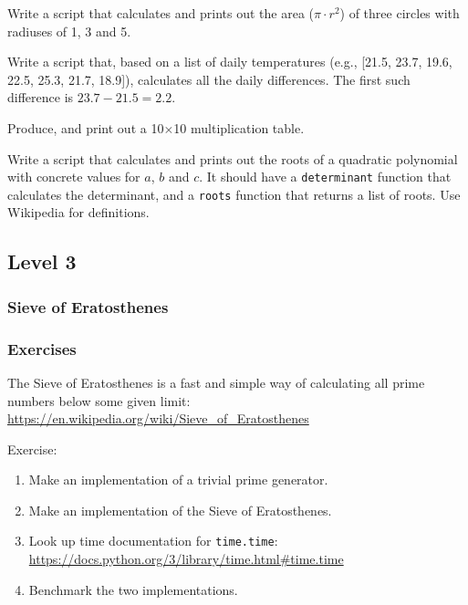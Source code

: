 {\begin{frame}[fragile]
    \vspace{3mm}
    Write a script that calculates and prints out the area ($\pi \cdot r^2$) of three circles with radiuses of 1, 3 and 5.
    
    \vspace{3mm}
    Write a script that, based on a list of daily temperatures (e.g., [21.5, 23.7, 19.6, 22.5, 25.3, 21.7, 18.9]), calculates all the daily differences. The first such difference is $23.7-21.5=2.2$.
    
    \vspace{3mm}
    Produce, and print out a 10$\times$10 multiplication table.
    
    \vspace{3mm}
    Write a script that calculates and prints out the roots of a quadratic polynomial with concrete values for $a$, $b$ and $c$. It should have a \texttt{determinant} function that calculates the determinant, and a \texttt{roots} function that returns a list of roots. Use Wikipedia for definitions.
\end{frame}

\subsection{Level 3}

\subsubsection{Sieve of Eratosthenes}
\begin{frame}[fragile]
    \frametitle{Exercises  }
    \vspace{3mm}
    The Sieve of Eratosthenes is a fast and simple way of calculating all prime numbers below some given limit: \url{https://en.wikipedia.org/wiki/Sieve_of_Eratosthenes}
    
    \vspace{5mm}
    Exercise:
    \begin{enumerate}
      \item Make an implementation of a trivial prime generator.
      \item Make an implementation of the Sieve of Eratosthenes.
      \item Look up time documentation for \texttt{time.time}: \url{https://docs.python.org/3/library/time.html#time.time}
      \item Benchmark the two implementations.
    \end{enumerate}
\end{frame}

}
